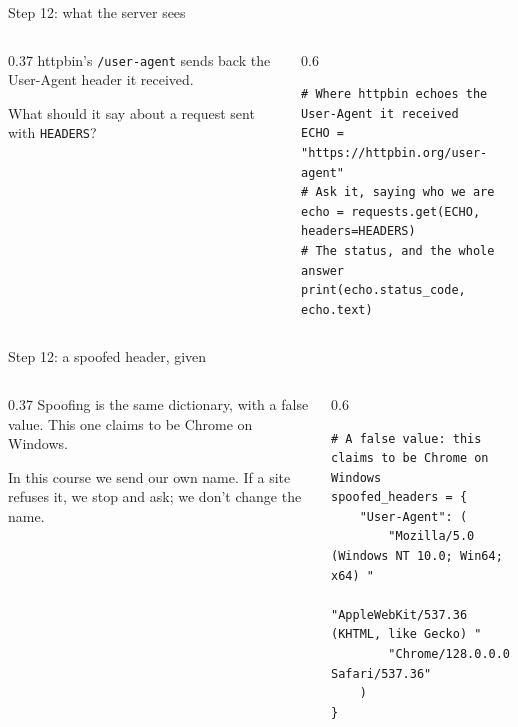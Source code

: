 \documentclass[9pt,aspectratio=169]{beamer}
\begin{document}
\begin{frame}[fragile]{Step 12: what the server sees}
    \begin{columns}[T]
        \begin{column}{0.37\textwidth}
            httpbin's \texttt{/user-agent} sends back the User-Agent header it received.

            \medskip
            What should it say about a request sent with \texttt{HEADERS}?
        \end{column}
        \begin{column}{0.6\textwidth}
\begin{lstlisting}[style=lab]
# Where httpbin echoes the User-Agent it received
ECHO = "https://httpbin.org/user-agent"
# Ask it, saying who we are
echo = requests.get(ECHO, headers=HEADERS)
# The status, and the whole answer
print(echo.status_code, echo.text)
\end{lstlisting}
        \end{column}
    \end{columns}
\end{frame}

\begin{frame}[fragile]{Step 12: a spoofed header, given}
    \begin{columns}[T]
        \begin{column}{0.37\textwidth}
            Spoofing is the same dictionary, with a false value. This one claims to be Chrome on Windows.

            \medskip
            In this course we send our own name. If a site refuses it, we stop and ask; we don't change the name.
        \end{column}
        \begin{column}{0.6\textwidth}
\begin{lstlisting}[style=lab]
# A false value: this claims to be Chrome on Windows
spoofed_headers = {
    "User-Agent": (
        "Mozilla/5.0 (Windows NT 10.0; Win64; x64) "
        "AppleWebKit/537.36 (KHTML, like Gecko) "
        "Chrome/128.0.0.0 Safari/537.36"
    )
}
\end{lstlisting}
        \end{column}
    \end{columns}
\end{frame}
\end{document}
